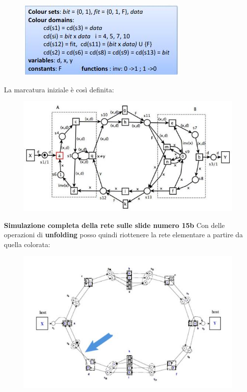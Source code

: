 \documentclass[a4paper,12pt, oneside]{book}
\begin{document}
\begin{figure}[H]
  \centering
  \includegraphics[scale = 0.6]{img/abt6.jpg}
\end{figure}
La marcatura iniziale è così definita:
\begin{figure}[H]
  \centering
  \includegraphics[scale = 0.55]{img/abt7.jpg}
\end{figure}
\textbf{Simulazione completa della rete sulle slide numero 15b}
\newpage
Con delle operazioni di \textbf{unfolding} posso quindi riottenere la rete
elementare a partire da quella colorata:
\begin{figure}[H]
  \centering
  \includegraphics[scale = 0.72]{img/abt12.jpg}
\end{figure}
\end{document}
